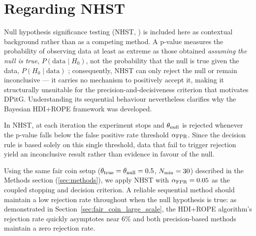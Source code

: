 \section{Regarding NHST}\label{app:nhst}
Null hypothesis significance testing (NHST, \citealt{fisher1925, neymanpearson1933})
%
is included here as contextual background rather than as a competing method.
A p-value measures the probability of observing data at least as extreme as those
obtained \emph{assuming the null is true}, $P(\mathrm{data}\mid H_0)$, not the
probability that the null is true given the data, $P(H_0\mid\mathrm{data})$
%
\citep{cohen1994, wasserstein2016};
consequently, NHST can only reject the null or remain inconclusive --- it carries
no mechanism to positively accept it, making it structurally unsuitable for the
precision-and-decisiveness criterion that motivates DPitG.
Understanding its sequential behaviour nevertheless clarifies why the Bayesian
HDI+ROPE framework was developed.

In NHST, at each iteration the experiment stops and $\theta_{\rm null}$ is rejected
whenever the p-value falls below the false positive rate threshold $\alpha_{\rm FPR}$.
Since the decision rule is based solely on this single threshold, data that fail to
trigger rejection yield an inconclusive result rather than evidence in favour of the null.

Using the same fair coin setup ($\theta_{\rm true}=\theta_{\rm null}=0.5$, $N_{\rm min}=30$) described
in the Methods section (\ref{sec:methods}), we apply NHST with $\alpha_{\rm FPR}=0.05$
as the coupled stopping and decision criterion. A reliable sequential method should maintain a
low rejection rate throughout when the null hypothesis is true: as demonstrated in
Section~\ref{sec:fair_coin_large_scale}, the HDI+ROPE algorithm's rejection rate quickly asymptotes near 6\% and
both precision-based methods maintain a zero rejection rate.

